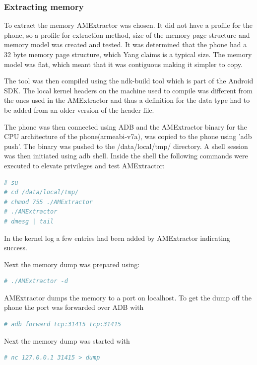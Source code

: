 


\subsubsection{Extracting memory}
To extract the memory AMExtractor\cite{yang2016tool} was chosen.
 It did not have a profile for the phone, so a profile for extraction method, size of the memory page structure and memory model was created and tested. It was determined that the phone had a 32 byte memory page structure, which Yang\cite{yang2016tool} claims is a typical size. The memory model was flat, which meant that it was contiguous making it simpler to copy.
 
 The tool was then compiled using the ndk-build tool which is part of the Android SDK. The local kernel headers on the machine used to compile was different from the ones used in the AMExtractor and thus a definition for the data type had to be added from an older version of the header file.
 
 The phone was then connected using ADB and the AMExtractor binary for the CPU architecture of the phone(armeabi-v7a), was copied to the phone using 'adb push'. The binary was pushed to the /data/local/tmp/ directory. A shell session was then initiated using adb shell. Inside the shell the following commands were executed to elevate privileges and test AMExtractor:
 \begin{lstlisting}[language=bash]
# su
# cd /data/local/tmp/
# chmod 755 ./AMExtractor
# ./AMExtractor
# dmesg | tail
 \end{lstlisting}
 In the kernel log a few entries had been added by AMExtractor indicating success.
 
 Next the memory dump was prepared using:
  \begin{lstlisting}[language=bash]
# ./AMExtractor -d
 \end{lstlisting}
 
AMExtractor dumps the memory to a port on localhost. To get the dump off the phone the port was forwarded over ADB with 
 \begin{lstlisting}[language=bash]
# adb forward tcp:31415 tcp:31415
 \end{lstlisting}
Next the memory dump was started with
 \begin{lstlisting}[language=bash]
# nc 127.0.0.1 31415 > dump
  \end{lstlisting}

